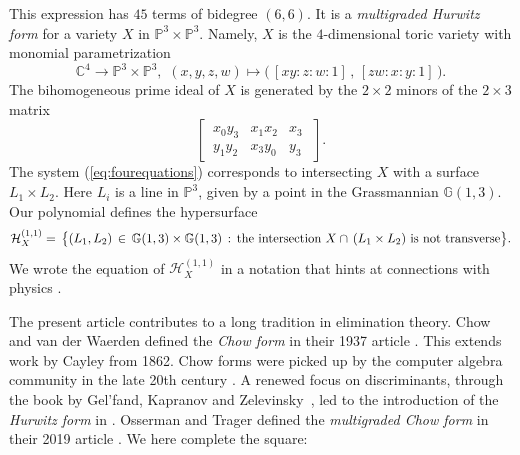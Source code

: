 \documentclass[12pt]{article}
\theoremstyle{definition}
\newcommand{\bC}{\mathbb C}
\newcommand{\bG}{\mathbb G}
\newcommand{\bP}{\mathbb P}
\newcommand{\cH}{\mathcal H}
\begin{document}
This expression has $45$ terms of bidegree $(6,6)$. It is a {\em multigraded Hurwitz form} for a 
 variety $X$ in $\bP^3 \times \bP^3$.
Namely, $X$ is the $4$-dimensional toric variety with monomial parametrization
\begin{equation}
\label{eq:toricvariety}
 \bC^4 \rightarrow \bP^3 \times \bP^3, \,\, (x,y,z,w) \mapsto \bigl(\,  [xy:z:w:1] \,,\,[zw:x:y:1]\, \bigr) . 
 \end{equation}
 The bihomogeneous prime ideal of $X$ is generated by the $2 \times 2$ minors of the $2 \times 3$ matrix
 \begin{equation}
 \label{eq:twobythree}
 \begin{bmatrix} \,x_0 y_3 & x_1 x_2 & x_3 \,\,\\
\,y_1 y_2 & x_3 y_0 & y_3 \,\,\end{bmatrix}.
\end{equation}
The system (\ref{eq:fourequations}) corresponds to
intersecting $X$ with a surface $ L_1 \times L_2 $.
Here $L_i$ is a line in $\bP^3$, given
by a point in the Grassmannian $\bG(1,3)$. Our polynomial defines the hypersurface
$$ \cH^{(1,1)}_X   = \,
\bigl\{ (L_1 , L_2) \, \in \, \bG(1,3) \times \bG(1,3) \,:\,
\hbox{the intersection} \,\,X \cap \,(L_1 \times L_2) \,\,\hbox{is not transverse} \bigl\}. $$
 We wrote the equation of $  \cH^{(1,1)}_X  $  in a notation that 
 hints at connections with physics \cite{HMPS2}.
 
 \smallskip
 
 The present article contributes to a long tradition in elimination theory.
Chow and van der Waerden defined the {\em Chow form} in
their 1937 article \cite{CW}. 
This extends work by Cayley from 1862.
Chow forms were picked up
by the computer algebra community in the late 20th century \cite{JKSS}.
A renewed focus on discriminants, through the book by
Gel'fand, Kapranov and Zelevinsky~\cite{GKZ}, led to the
introduction of the {\em Hurwitz form} in \cite{hurwitz}.
Osserman and Trager defined the {\em multigraded Chow form} in their
2019 article \cite{OT}.
We here complete the square:
\end{document}

